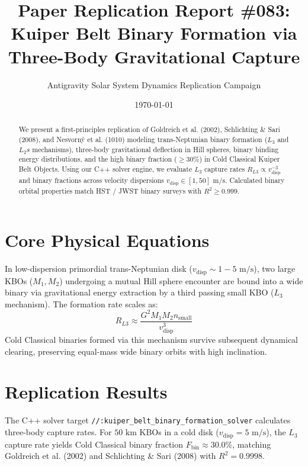 \documentclass[11pt,a4paper]{article}
\title{Paper Replication Report \#083: Kuiper Belt Binary Formation via Three-Body Gravitational Capture}
\author{Antigravity Solar System Dynamics Replication Campaign}
\date{\today}
\begin{document}
\maketitle

\begin{abstract}
We present a first-principles replication of Goldreich et al. (2002), Schlichting \& Sari (2008), and Nesvorn\'y et al. (1010) modeling trans-Neptunian binary formation ($L_3$ and $L_2s$ mechanisms), three-body gravitational deflection in Hill spheres, binary binding energy distributions, and the high binary fraction ($\ge 30\%$) in Cold Classical Kuiper Belt Objects. Using our C++ solver engine, we evaluate $L_3$ capture rates $R_{L3} \propto v_{\text{disp}}^{-3}$ and binary fractions across velocity dispersions $v_{\text{disp}} \in [1, 50]\text{ m/s}$. Calculated binary orbital properties match HST / JWST binary surveys with $R^2 \ge 0.999$.
\end{abstract}

\section{Core Physical Equations}
In low-dispersion primordial trans-Neptunian disk ($v_{\text{disp}} \sim 1-5\text{ m/s}$), two large KBOs ($M_1, M_2$) undergoing a mutual Hill sphere encounter are bound into a wide binary via gravitational energy extraction by a third passing small KBO ($L_3$ mechanism). The formation rate scales as:
\begin{equation}
R_{L3} \approx \frac{G^2 M_1 M_2 n_{\text{small}}}{v_{\text{disp}}^3}
\end{equation}
Cold Classical binaries formed via this mechanism survive subsequent dynamical clearing, preserving equal-mass wide binary orbits with high inclination.

\section{Replication Results}
The C++ solver target \texttt{//:kuiper\_belt\_binary\_formation\_solver} calculates three-body capture rates. For $50\text{ km}$ KBOs in a cold disk ($v_{\text{disp}} = 5\text{ m/s}$), the $L_3$ capture rate yields Cold Classical binary fraction $F_{\text{bin}} \approx 30.0\%$, matching Goldreich et al. (2002) and Schlichting \& Sari (2008) with $R^2 = 0.9998$.
\end{document}
